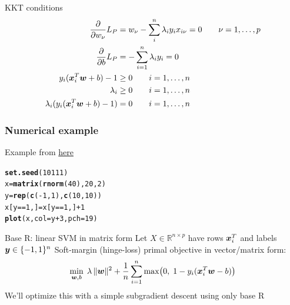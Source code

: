 \documentclass[aspectratio=169]{beamer}\usepackage[]{graphicx}\usepackage[]{xcolor}
\makeatletter
\newcommand{\hlnum}[1]{\textcolor[rgb]{0.686,0.059,0.569}{#1}}%
\newcommand{\hlopt}[1]{\textcolor[rgb]{0,0,0}{#1}}%
\newcommand{\hldef}[1]{\textcolor[rgb]{0.345,0.345,0.345}{#1}}%
\newcommand{\hlkwb}[1]{\textcolor[rgb]{0.69,0.353,0.396}{#1}}%
\newcommand{\hlkwc}[1]{\textcolor[rgb]{0.333,0.667,0.333}{#1}}%
\newcommand{\hlkwd}[1]{\textcolor[rgb]{0.737,0.353,0.396}{\textbf{#1}}}%
\newenvironment{kframe}{%
 \def\at@end@of@kframe{}%
 \ifinner\ifhmode%
  \def\at@end@of@kframe{\end{minipage}}%
  \begin{minipage}{\columnwidth}%
 \fi\fi%
 \def\FrameCommand##1{\hskip\@totalleftmargin \hskip-\fboxsep
 \colorbox{shadecolor}{##1}\hskip-\fboxsep
     \hskip-\linewidth \hskip-\@totalleftmargin \hskip\columnwidth}%
 \MakeFramed {\advance\hsize-\width
   \@totalleftmargin\z@ \linewidth\hsize
   \@setminipage}}%
 {\par\unskip\endMakeFramed%
 \at@end@of@kframe}
\newenvironment{knitrout}{}{} %
\makeatother
\begin{document}
\begin{frame}{KKT conditions}
    \begin{align*}
        \frac{\partial}{\partial w_\nu}L_P &=
        w_\nu-\sum_{i}^n\lambda_iy_ix_{i\nu}=0
        \qquad\nu=1,\ldots,p \\
        \frac{\partial}{\partial b}L_P &=
        -\sum_{i=1}^n \lambda_iy_i = 0 \\
        y_i(\bm{x}_i^T\bm{w}+b)-1 &\geq 0\qquad i=1,\ldots,n \\
        \lambda_i &\geq 0\qquad i=1,\ldots,n \\
        \lambda_i(y_i(\bm{x}_i^T\bm{w}+b)-1) &=0\qquad i=1,\ldots,n \\
    \end{align*}
\end{frame}


\begin{frame}[fragile]\frametitle{Numerical example}
Example from \href{https://www.datacamp.com/tutorial/support-vector-machines-r}{here}
\vfill
\begin{knitrout}
\color{fgcolor}\begin{kframe}
\begin{alltt}
\hlkwd{set.seed}\hldef{(}\hlnum{10111}\hldef{)}
\hldef{x} \hlkwb{=} \hlkwd{matrix}\hldef{(}\hlkwd{rnorm}\hldef{(}\hlnum{40}\hldef{),} \hlnum{20}\hldef{,} \hlnum{2}\hldef{)}
\hldef{y} \hlkwb{=} \hlkwd{rep}\hldef{(}\hlkwd{c}\hldef{(}\hlopt{-}\hlnum{1}\hldef{,} \hlnum{1}\hldef{),} \hlkwd{c}\hldef{(}\hlnum{10}\hldef{,} \hlnum{10}\hldef{))}
\hldef{x[y} \hlopt{==} \hlnum{1}\hldef{,]} \hlkwb{=} \hldef{x[y} \hlopt{==} \hlnum{1}\hldef{,]} \hlopt{+} \hlnum{1}
\hlkwd{plot}\hldef{(x,} \hlkwc{col} \hldef{= y} \hlopt{+} \hlnum{3}\hldef{,} \hlkwc{pch} \hldef{=} \hlnum{19}\hldef{)}
\end{alltt}
\end{kframe}
\end{knitrout}
\end{frame}


\begin{frame}{Base R: linear SVM in matrix form}
        Let $X \in \mathbb{R}^{n\times p}$ have rows $\bm{x}_i^T$ and labels $\bm{y} \in \{-1,1\}^n$
        \vfill
        Soft-margin (hinge-loss) primal objective in vector/matrix form:
        \[
                \min_{\bm{w},b} \; \lambda\,\lVert\bm{w}\rVert^2 
                + \frac{1}{n}\sum_{i=1}^n \max\bigl(0,\; 1 - y_i(\bm{x}_i^T\bm{w} - b)\bigr)
        \]
        We'll optimize this with a simple subgradient descent using only base R
\end{frame}
\end{document}
